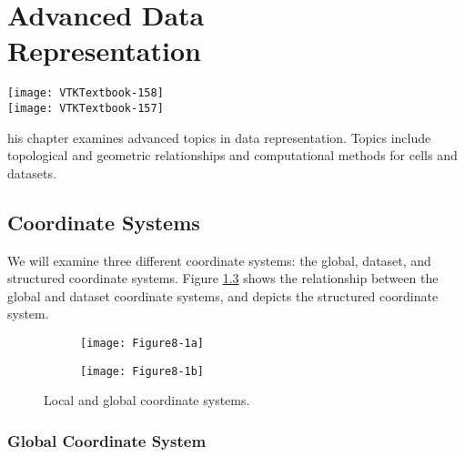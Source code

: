 \chapter[Advanced Data Representation]{Advanced Data\\ Representation}
\label{chap:advanced_data_representation}

\vspace{-9\baselineskip} %
\hfill
 \begin{minipage}{0.5\textwidth}
 \centering
 \texttt{[image: VTKTextbook-158]}\\
 \texttt{[image: VTKTextbook-157]}
 \end{minipage}
\vspace{2\baselineskip}

his chapter examines advanced topics in data representation.
Topics include topological and geometric relationships and computational methods for cells and datasets.

\section{Coordinate Systems}

We will examine three different coordinate systems: the global, dataset, and structured coordinate systems.
Figure \ref{fig:Figure8-1} shows the relationship between the global and dataset coordinate systems, and depicts the structured coordinate system.

\begin{figure}[!htb]
    \centering
    \begin{subfigure}{0.48\linewidth}
        \centering
        \texttt{[image: Figure8-1a]}
        \caption*{}\label{fig:Figure8-1a}
    \end{subfigure}
    \hfill
    \begin{subfigure}{0.48\linewidth}
        \centering
        \texttt{[image: Figure8-1b]}
        \caption*{}\label{fig:Figure8-1b}
    \end{subfigure}%
    \caption{Local and global coordinate systems.}
    \label{fig:Figure8-1}
\end{figure}


\subsection{Global Coordinate System}

